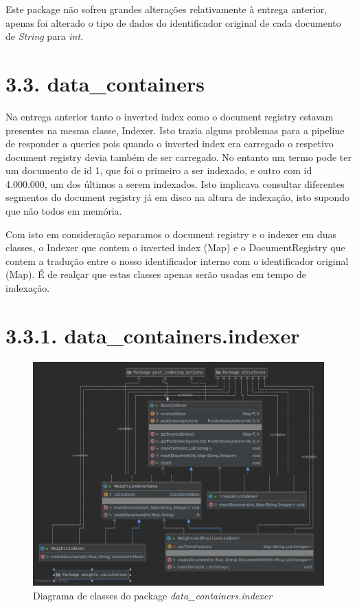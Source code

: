 \documentclass[12pt]{article}
\begin{document}
Este package não sofreu grandes alterações relativamente à entrega
anterior, apenas foi alterado o tipo de dados do identificador
original de cada documento de {\it String} para {\it int}.

\section*{3.3. data\_containers}
Na entrega anterior tanto o inverted index como o document registry
estavam presentes na mesma classe, Indexer.
Isto trazia alguns problemas para a pipeline de responder a queries
pois quando o inverted index era carregado o respetivo document
registry devia também de ser carregado.
No entanto um termo pode ter um documento de id 1, que foi o primeiro
a ser indexado, e outro com id 4.000.000, um dos últimos a serem
indexados.
Isto implicava consultar diferentes segmentos do document registry já
em disco na altura de indexação, isto supondo que não todos em
memória.

Com isto em consideração separamos o document registry e o indexer em
duas classes, o Indexer que contem o inverted index (Map) e o
DocumentRegistry que contem a tradução entre o nosso identificador
interno com o identificador original (Map).
É de realçar que estas classes apenas serão usadas em tempo de
indexação.

\section*{3.3.1. data\_containers.indexer}
\begin{figure}[h]
  \center
  \includegraphics[width=\linewidth]{packages_data_containers_indexer.png}
  \caption{Diagrama de classes do package \it
    data\_containers.indexer}
\end{figure}
\end{document}
